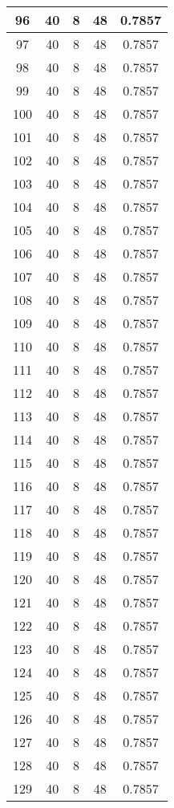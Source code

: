 \documentclass[letterpaper, 12pt]{article}
\begin{document}
\begin{longtable}{|c|c|c|c|c|}
\hline
96 & 40 & 8 & 48 & 0.7857 \\
\hline
97 & 40 & 8 & 48 & 0.7857 \\
\hline
98 & 40 & 8 & 48 & 0.7857 \\
\hline
99 & 40 & 8 & 48 & 0.7857 \\
\hline
100 & 40 & 8 & 48 & 0.7857 \\
\hline
101 & 40 & 8 & 48 & 0.7857 \\
\hline
102 & 40 & 8 & 48 & 0.7857 \\
\hline
103 & 40 & 8 & 48 & 0.7857 \\
\hline
104 & 40 & 8 & 48 & 0.7857 \\
\hline
105 & 40 & 8 & 48 & 0.7857 \\
\hline
106 & 40 & 8 & 48 & 0.7857 \\
\hline
107 & 40 & 8 & 48 & 0.7857 \\
\hline
108 & 40 & 8 & 48 & 0.7857 \\
\hline
109 & 40 & 8 & 48 & 0.7857 \\
\hline
110 & 40 & 8 & 48 & 0.7857 \\
\hline
111 & 40 & 8 & 48 & 0.7857 \\
\hline
112 & 40 & 8 & 48 & 0.7857 \\
\hline
113 & 40 & 8 & 48 & 0.7857 \\
\hline
114 & 40 & 8 & 48 & 0.7857 \\
\hline
115 & 40 & 8 & 48 & 0.7857 \\
\hline
116 & 40 & 8 & 48 & 0.7857 \\
\hline
117 & 40 & 8 & 48 & 0.7857 \\
\hline
118 & 40 & 8 & 48 & 0.7857 \\
\hline
119 & 40 & 8 & 48 & 0.7857 \\
\hline
120 & 40 & 8 & 48 & 0.7857 \\
\hline
121 & 40 & 8 & 48 & 0.7857 \\
\hline
122 & 40 & 8 & 48 & 0.7857 \\
\hline
123 & 40 & 8 & 48 & 0.7857 \\
\hline
124 & 40 & 8 & 48 & 0.7857 \\
\hline
125 & 40 & 8 & 48 & 0.7857 \\
\hline
126 & 40 & 8 & 48 & 0.7857 \\
\hline
127 & 40 & 8 & 48 & 0.7857 \\
\hline
128 & 40 & 8 & 48 & 0.7857 \\
\hline
129 & 40 & 8 & 48 & 0.7857 \\

\end{longtable}
\end{document}

